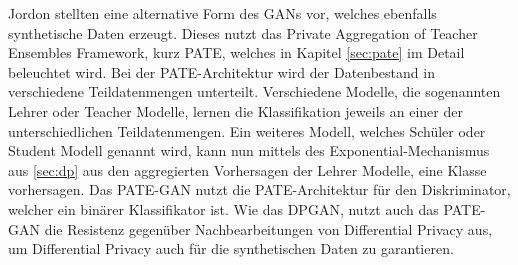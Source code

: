 Jordon \etal \cite{P-68} stellten eine alternative Form des GANs vor, welches ebenfalls synthetische Daten erzeugt. 
Dieses nutzt das Private Aggregation of Teacher Ensembles Framework, kurz PATE, welches in Kapitel \ref{sec:pate} im Detail beleuchtet wird.
Bei der PATE-Architektur wird der Datenbestand in verschiedene Teildatenmengen unterteilt. 
Verschiedene Modelle, die sogenannten Lehrer oder Teacher Modelle, lernen die Klassifikation jeweils an einer der unterschiedlichen Teildatenmengen.
Ein weiteres Modell, welches Schüler oder Student Modell genannt wird, kann nun mittels des Exponential-Mechanismus aus \ref{sec:dp} aus den aggregierten Vorhersagen der Lehrer Modelle, eine Klasse vorhersagen.
Das PATE-GAN nutzt die PATE-Architektur für den Diskriminator, welcher ein binärer Klassifikator ist.
Wie das DPGAN, nutzt auch das PATE-GAN die Resistenz gegenüber Nachbearbeitungen von Differential Privacy aus, um Differential Privacy auch für die synthetischen Daten zu garantieren.


